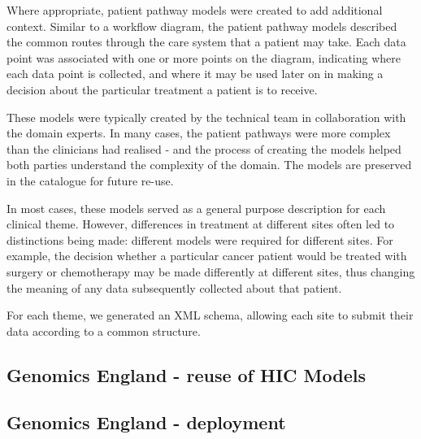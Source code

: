 Where appropriate, patient pathway models were created to add
additional context.  Similar to a workflow diagram, the patient
pathway models described the common routes through the care system
that a patient may take.  Each data point was associated with one or
more points on the diagram, indicating where each data point is
collected, and where it may be used later on in making a decision
about the particular treatment a patient is to receive.

These models were typically created by the technical team in
collaboration with the domain experts.  In many cases, the patient
pathways were more complex than the clinicians had realised - and the
process of creating the models helped both parties understand the
complexity of the domain.  The models are preserved in the catalogue
for future re-use.

In most cases, these models served as a general purpose description
for each clinical theme.  However, differences in treatment at
different sites often led to distinctions being made: different models
were required for different sites.  For example, the decision whether
a particular cancer patient would be treated with surgery or
chemotherapy may be made differently at different sites, thus changing
the meaning of any data subsequently collected about that patient.

For each theme, we generated an XML schema, allowing each site to
submit their data according to a common structure.   


\subsection{Genomics England - reuse of HIC Models}

\subsection{Genomics England -  deployment}
